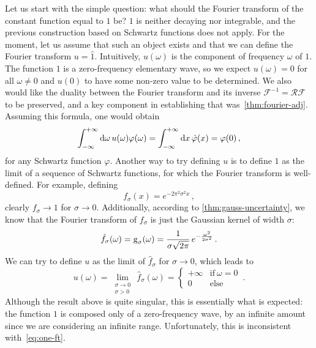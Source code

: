 Let us start with the simple question: what should the Fourier transform of the constant
function equal to $1$ be? $1$ is neither decaying nor integrable, and the previous
construction based on Schwartz functions does not apply. For the moment, let us assume
that such an object exists and that we can define the Fourier transform $u=\hat{1}$.
Intuitively, $u(\omega)$ is the component of frequency $\omega$ of $1$. The function $1$
is a zero-frequency elementary wave, so we expect $u(\omega)=0$ for all $\omega\neq 0$ and
$u(0)$ to have some non-zero value to be determined. We also would like the duality
between the Fourier transform and its inverse $\mathcal{F}^{-1}=\mathcal{R}\mathcal{F}$ to
be preserved, and a key component in establishing that was~\cref{thm:fourier-adj}.
Assuming this formula, one would obtain
\begin{equation}
  \int_{-\infty}^{+\infty}\mathrm{d}{\omega}\,u(\omega)\varphi(\omega)=\int_{-\infty}^{+\infty}\mathrm{d}{x}\,\hat{\varphi}(x)=\varphi(0)\,,
  \label{eq:one-ft}
\end{equation}
for any Schwartz function $\varphi$. Another way to try defining $u$ is to define $1$ as
the limit of a sequence of Schwartz functions, for which the Fourier transform is
well-defined. For example, defining
\begin{equation}
  f_{\sigma}(x)=e^{-2\pi^2\sigma^2 x}\,,
\end{equation}
clearly $f_\sigma\to 1$ for $\sigma\to 0$. Additionally, according to
\cref{thm:gauss-uncertainty}, we know that the Fourier transform of $f_{\sigma}$ is just
the Gaussian kernel of width $\sigma$:
\begin{equation}
  \hat{f}_{\sigma}(\omega)=\operatorname{g}_\sigma(\omega)=\frac{1}{\sigma\sqrt{2\pi}}\,
  e^{-\frac{\omega^2}{2\sigma^2}}\,.
\end{equation}
We can try to define $u$ as the limit of $\hat{f}_{\sigma}$ for $\sigma\to 0$, which leads
to
\begin{equation}
  u(\omega)=\lim_{\substack{\sigma\to 0\\\sigma>0}}\,\hat{f}_{\sigma}(\omega)=
  \begin{cases}
    +\infty&\text{if}~\omega=0\\
    0&\text{else}
  \end{cases}\,.
\end{equation}
Although the result above is quite singular, this is essentially what is expected: the
function $1$ is composed only of a zero-frequency wave, by an infinite amount since we are
considering an infinite range. Unfortunately, this is inconsistent with~\cref{eq:one-ft}.
